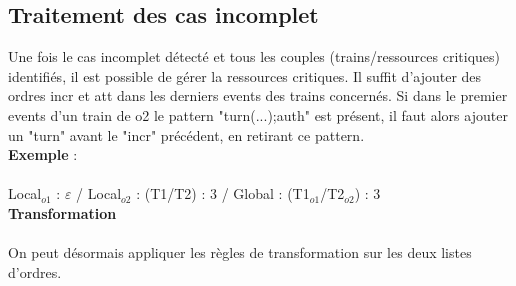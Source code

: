 \documentclass[12pt]{article}
\begin{document}
\subsection{Traitement des cas incomplet}
Une fois le cas incomplet détecté et tous les couples (trains/ressources critiques) identifiés,
il est possible de gérer la ressources critiques.
Il suffit d'ajouter des ordres incr et att dans les derniers events des trains concernés.
Si dans le premier events d'un train de o2 le pattern "turn(...);auth" est présent, il faut
alors ajouter un "turn" avant le "incr" précédent, en retirant ce pattern.
\\
\textbf{Exemple} :
\vspace{0.5cm}
\\
\vspace{0.5cm}\\
Local$_{o1}$ : $\varepsilon$ / Local$_{o2}$ : (T1/T2) : 3 / Global : {\color{Cerulean}(T1$_{o1}$/T2$_{o2}$) : 3} \\
\textbf{Transformation}
\vspace{0.2cm}
\\
\vspace{0.5cm}\\
On peut désormais appliquer les règles de transformation sur les deux listes d'ordres.
\end{document}
